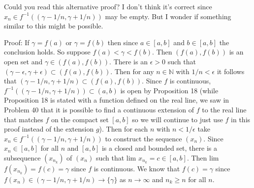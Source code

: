 \documentclass[a4paper]{article}
\begin{document}
Could you read this alternative proof? I don't think it's correct since $x_n \in f^{-1}((\gamma-1/n, \gamma + 1/n))$ may be empty. But I wonder if something similar to this might be possible. 

Proof: If $\gamma = f(a)$ or $\gamma = f(b)$ then since $a \in [a,b]$ and $b \in [a,b]$ the conclusion holds. So suppose $f(a) < \gamma < f(b)$. Then $(f(a),f(b))$ is an open set and $\gamma \in (f(a),f(b))$. There is an $\epsilon > 0$ such that $(\gamma - \epsilon, \gamma + \epsilon) \subset (f(a),f(b))$. Then for any $n \in \mathbb{N}$ with $1/n<\epsilon$ it follows that $(\gamma-1/n, \gamma + 1/n) \subset (f(a),f(b))$. Since $f$ is continuous, $f^{-1}((\gamma-1/n, \gamma + 1/n)) \subset (a,b)$ is open by Proposition 18 (while Proposition 18 is stated with a function defined on the real line, we saw in Problem 40 that it is possible to find a continuous extension of $f$ to the real line that matches $f$ on the compact set $[a,b]$ so we will continue to just use $f$ in this proof instead of the extension $g$). Then for each $n$ with $n<1/\epsilon$ take $x_n \in f^{-1}((\gamma-1/n, \gamma + 1/n))$ to construct the sequence $(x_n)$. Since $x_n \in [a,b]$ for all $n$ and $[a,b]$ is a closed and bounded set, there is a subsequence $(x_{n_k})$ of $(x_n)$ such that lim $x_{n_k} = c \in [a,b]$. Then lim $f(x_{n_k}) = f(c) = \gamma$ since $f$ is continuous. We know that $f(c) = \gamma$ since $f(x_n) \in (\gamma - 1/n, \gamma + 1/n) \rightarrow \{\gamma\}$ as $n \rightarrow \infty$ and $n_k \geq n$ for all $n$. \\
\end{document}

